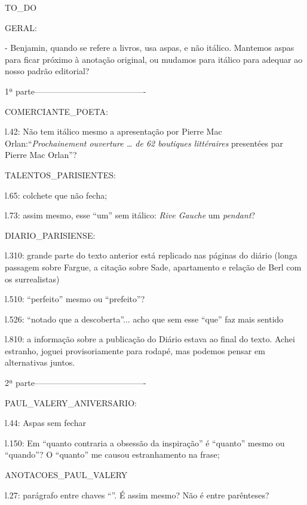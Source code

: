 TO_DO

GERAL:

- Benjamin, quando se refere a livros, usa aspas, e não itálico. Mantemos aspas para ficar próximo à anotação original, ou mudamos para itálico para adequar ao nosso padrão editorial?



1ª parte----------------------------------------

COMERCIANTE_POETA:

l.42: Não tem itálico mesmo a apresentação por Pierre Mac Orlan:``\emph{Prochainement ouverture \ldots{} de 62 boutiques littéraires} presentées par Pierre Mac Orlan''?

TALENTOS_PARISIENTES:

l.65: colchete que não fecha;

l.73: assim mesmo, esse ``um'' sem itálico: \emph{Rive Gauche} um \emph{pendant}?

DIARIO_PARISIENSE:

l.310: grande parte do texto anterior está replicado nas páginas do diário (longa passagem sobre Fargue, a citação sobre Sade, apartamento e relação de Berl com os surrealistas)

l.510: ``perfeito'' mesmo ou ``prefeito''?

l.526: ``notado que a descoberta''... acho que sem esse ``que'' faz mais sentido

l.810: a informação sobre a publicação do Diário estava ao final do texto. Achei estranho, joguei provisoriamente para rodapé, mas podemos pensar em alternativas juntos.


2ª parte----------------------------------------

PAUL_VALERY_ANIVERSARIO:

l.44: Aspas sem fechar

l.150: Em ``quanto contraria a obsessão da inspiração'' é ``quanto'' mesmo ou ``quando''? O ``quanto'' me causou estranhamento na frase;

ANOTACOES_PAUL_VALERY

l.27: parágrafo entre chaves ``{}''. É assim mesmo? Não é entre parênteses?